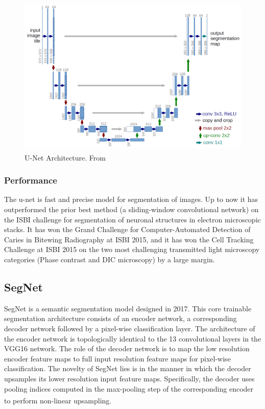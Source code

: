 \begin{figure}[H]
\centering
\includegraphics[width=\columnwidth]{../images/u-net-architecture.png}
\caption{U-Net Architecture. From \textsuperscript{\cite{ronneberger2015u}}}
\label{fig:CNN}
\end{figure}

\subsubsection{Performance}
The u-net is fast and precise model for segmentation of images. Up to now it has outperformed the prior best method (a sliding-window convolutional network) on the ISBI challenge for segmentation of neuronal structures in electron microscopic stacks. It has won the Grand Challenge for Computer-Automated Detection of Caries in Bitewing Radiography at ISBI 2015, and it has won the Cell Tracking Challenge at ISBI 2015 on the two most challenging transmitted light microscopy categories (Phase contrast and DIC microscopy) by a large margin.

\subsection{SegNet}

SegNet is a semantic segmentation model designed in 2017. This core trainable segmentation architecture consists of an encoder network, a corresponding decoder network followed by a pixel-wise classification layer. The architecture of the encoder network is topologically identical to the 13 convolutional layers in the VGG16 network. The role of the decoder network is to map the low resolution encoder feature maps to full input resolution feature maps for pixel-wise classification. The novelty of SegNet lies is in the manner in which the decoder upsamples its lower resolution input feature maps. Specifically, the decoder uses pooling indices computed in the max-pooling step of the corresponding encoder to perform non-linear upsampling. \textsuperscript{\cite{badrinarayanan2017segnet}}

